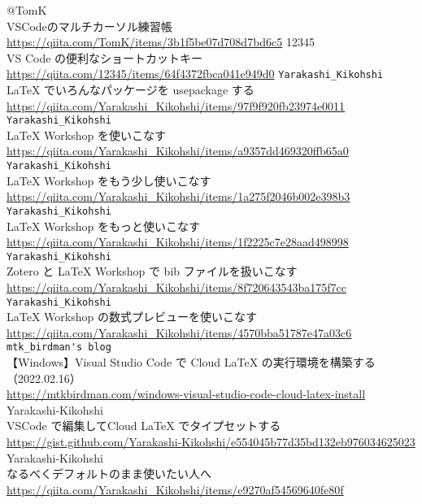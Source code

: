 \documentclass{ltjsarticle}
\begin{document}
\begin{thebibliography}{999}
  @TomK\\
  VSCodeのマルチカーソル練習帳\\
  \url{https://qiita.com/TomK/items/3b1f5be07d708d7bd6c5}
  12345\\
  VS Code の便利なショートカットキー\\
  \url{https://qiita.com/12345/items/64f4372fbca041e949d0}
  \verb|Yarakashi_Kikohshi|\\
  LaTeX でいろんなパッケージを usepackage する\\
  \url{https://qiita.com/Yarakashi_Kikohshi/items/97f9f920fb23974e0011}
  \verb|Yarakashi_Kikohshi|\\
  LaTeX Workshop を使いこなす\\
  \url{https://qiita.com/Yarakashi_Kikohshi/items/a9357dd469320ffb65a0}
  \verb|Yarakashi_Kikohshi|\\
  LaTeX Workshop をもう少し使いこなす\\
  \url{https://qiita.com/Yarakashi_Kikohshi/items/1a275f2046b002e398b3}
  \verb|Yarakashi_Kikohshi|\\
  LaTeX Workshop をもっと使いこなす\\
  \url{https://qiita.com/Yarakashi_Kikohshi/items/1f2225c7e28aad498998}
  \verb|Yarakashi_Kikohshi|\\
  Zotero と LaTeX Workshop で bib ファイルを扱いこなす\\
  \url{https://qiita.com/Yarakashi_Kikohshi/items/8f720643543ba175f7cc}
  \verb|Yarakashi_Kikohshi|\\
  LaTeX Workshop の数式プレビューを使いこなす\\
  \url{https://qiita.com/Yarakashi_Kikohshi/items/4570bba51787e47a03c6}
  \verb|mtk_birdman's blog|\\
  【Windows】Visual Studio Code で Cloud LaTeX の実行環境を構築する（2022.02.16）\\
  \url{https://mtkbirdman.com/windows-visual-studio-code-cloud-latex-install}
  Yarakashi-Kikohshi\\
  VSCode で編集してCloud LaTeX でタイプセットする\\
  \url{https://gist.github.com/Yarakashi-Kikohshi/e554045b77d35bd132eb976034625023}
  Yarakashi-Kikohshi\\
  なるべくデフォルトのまま使いたい人へ\\
  \url{https://qiita.com/Yarakashi_Kikohshi/items/e9270af54569640fe80f}
  
\end{thebibliography}
\end{document}
